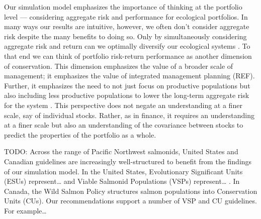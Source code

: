 Our simulation model emphasizes the importance of thinking at the portfolio level --- considering aggregate risk and performance for ecological portfolios. In many ways our results are intuitive, however, we often don't consider aggregate risk despite the many benefits to doing so. Only by simultaneously considering aggregate risk and return can we optimally diversify our ecological systems \citep{ando2012}. To that end we can think of portfolio risk-return performance as another dimension of conservation. This dimension emphasizes the value of a broader scale of management; it emphasizes the value of integrated management planning (REF). Further, it emphasizes the need to not just focus on productive populations but also including less productive populations to lower the long-term aggregate risk for the system \citep{hilborn2003}. This perspective does not negate an understanding at a finer scale, say of individual stocks. Rather, as in finance, it requires an understanding at a finer scale but also an understanding of the covariance between stocks to predict the properties of the portfolio as a whole.

TODO: Across the range of Pacific Northwest salmonids, United States and Canadian guidelines are increasingly well-structured to benefit from the findings of our simulation model. In the United States, Evolutionary Significant Units (ESUs) represent\ldots{} and Viable Salmonid Populations (VSPs) represent\ldots{} \citep{mceacheran2000, waples1991, moritz1994}. In Canada, the Wild Salmon Policy \citep{dfo2005wsp} structures salmon populations into Conservation Units (CUs). Our recommendations support a number of VSP and CU guidelines. For example\ldots{}

